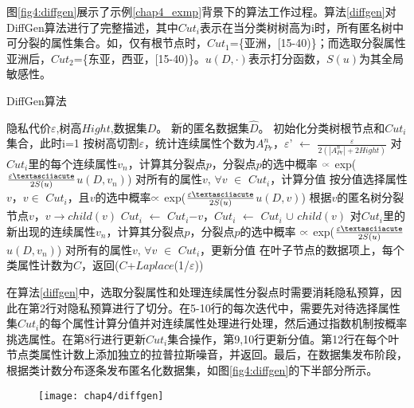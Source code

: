 图\ref{fig4:diffgen}展示了示例\ref{chap4_exmp}背景下的算法工作过程。算法\ref{diffgen}对DiffGen算法进行了完整描述，其中$Cut_{i}$表示在当分类树树高为i时，所有匿名树中可分裂的属性集合。如，仅有根节点时，$Cut_{1}$=\{亚洲，[15-40)\}；而选取分裂属性亚洲后，$Cut_{2}$=\{东亚，西亚，[15-40)\}。$u(D,\cdotp)$表示打分函数，$S(u)$为其全局敏感性。


\begin{algorithm}
	\caption{DiffGen算法} 
	\label{diffgen}
	\begin{algorithmic}[1]
		\REQUIRE 隐私代价$\varepsilon$,树高$Hight$,数据集$D$。
		\ENSURE 新的匿名数据集$\hat{D}$。
		\STATE 初始化分类树根节点和$Cut_{i}$集合，此时i=1
		\STATE 按树高切割$\varepsilon$，统计连续属性个数为$A_{Pr}^{n}$，$\varepsilon$' $\leftarrow$ $\frac{\varepsilon}{2(|A_{Pr}^{n}|+2Hight)}$
		\STATE 对$Cut_{i}$里的每个连续属性$v_{n}$，计算其分裂点$p$，分裂点$p$的选中概率 $\wasypropto$ exp($\frac{\varepsilon\textasciiacute}{2S(u)}$$u(D,v_{n})$)
		\STATE 对所有的属性$v$, $\forall$$v$ $\in$ $Cut_{i}$，计算分值
		\STATE 按分值选择属性$v$，$v$$\in$ $Cut_{i}$，且$v$的选中概率$\wasypropto$ exp($\frac{\varepsilon\textasciiacute}{2S(u)}$$u(D,v)$)
		\STATE 根据$v$的匿名树分裂节点$v$，$v$$\rightarrow$$child(v)$
		\STATE $Cut_{i}$ $\leftarrow$ $Cut_{i}$$ - $$v$，$Cut_{i}$ $\leftarrow$ $Cut_{i}$ $\cup$ $child(v)$
		\STATE 对$Cut_{i}$里的新出现的连续属性$v_{n}$，计算其分裂点$p$，分裂点$p$的选中概率 $\wasypropto$ exp($\frac{\varepsilon\textasciiacute}{2S(u)}$$u(D,v_{n})$)
		\STATE 对所有的属性$v$, $\forall$$v$ $\in$ $Cut_{i}$，更新分值
		\ENDFOR
		\RETURN 在叶子节点的数据项上，每个类属性计数为$C$，返回($C$+$\textit{Laplace}$(1/$\varepsilon$))
	\end{algorithmic}
\end{algorithm}

在算法\ref{diffgen}中，选取分裂属性和处理连续属性分裂点时需要消耗隐私预算，因此在第2行对隐私预算进行了切分。在5-10行的每次迭代中，需要先对待选择属性集$Cut_{i}$的每个属性计算分值并对连续属性处理进行处理，然后通过指数机制按概率挑选属性。在第8行进行更新$Cut_{i}$集合操作，第9,10行更新分值。第12行在每个叶节点类属性计数上添加独立的拉普拉斯噪音，并返回。最后，在数据集发布阶段，根据类计数分布逐条发布匿名化数据集，如图\ref{fig4:diffgen}的下半部分所示。

\begin{figure}[!htp]
	\centering
	\texttt{[image: chap4/diffgen]}
\end{figure}



